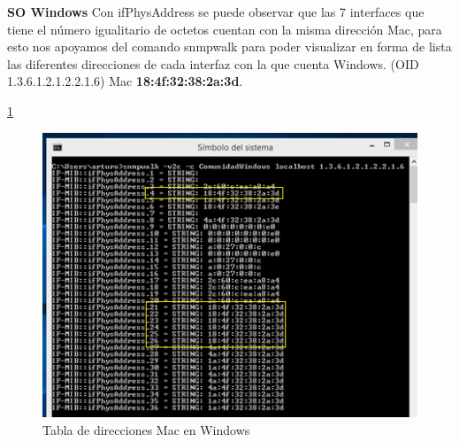 \textbf{SO Windows}
Con ifPhysAddress se puede observar que las 7 interfaces que tiene el número igualitario de octetos cuentan con la misma dirección Mac, para esto nos apoyamos del comando snmpwalk para poder visualizar en forma de lista las diferentes direcciones de cada interfaz con la que cuenta Windows. (OID 1.3.6.1.2.1.2.2.1.6)
Mac \textbf{18:4f:32:38:2a:3d}.

 \ref{image:Pregunta6W}
 \FloatBarrier
\begin{figure}[htbp!]
		\centering
		    \includegraphics[width=.5 \textwidth]{../images/Pregunta6W.png} 
		\caption{Tabla de direcciones Mac en Windows}
		\label{image:Pregunta6W}
\end{figure}
\FloatBarrier